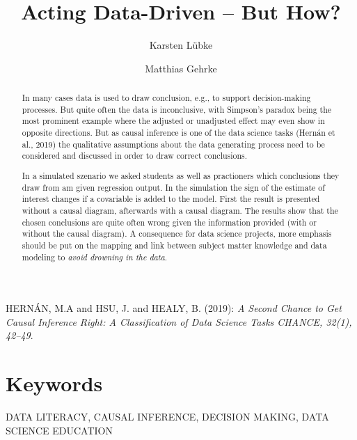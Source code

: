 \documentclass{svmult}
\begin{document}
\title*{Acting Data-Driven -- But How?}

\author{Karsten L\"{u}bke\and
Matthias Gehrke}
\maketitle

\begin{abstract}
In many cases data is used to draw conclusion, e.g., to support decision-making processes.
But quite often the data is inconclusive, with Simpson's paradox being the most prominent example where the adjusted or unadjusted effect may even show in opposite directions.
But as causal inference is one of the data science tasks (Hern\'{a}n et al., 2019) the qualitative assumptions about the data generating process need to be considered and discussed in order to draw correct conclusions.

In a simulated szenario we asked students as well as practioners which conclusions they draw from am given regression output. In the simulation the sign of the estimate of interest changes if a covariable is added to the model.
First the result is presented without a causal diagram, afterwards with a causal diagram. 
The results show that the chosen conclusions are quite often wrong given the information provided (with or without the causal diagram). 
A consequence for data science projects, more emphasis should be put on the mapping and link between subject matter knowledge and data modeling to {\em avoid drowning in the data}.


\end{abstract}

\begin{thebibliography}{1}

\item[]
HERN\'{A}N, M.A and HSU, J. and  HEALY, B. (2019): {\em A Second Chance to Get
Causal Inference Right: A Classification of Data Science Tasks CHANCE, 32(1), 42--49}. 

\end{thebibliography}

\section*{Keywords}
DATA LITERACY, CAUSAL INFERENCE, DECISION MAKING, DATA SCIENCE EDUCATION 
\end{document}
